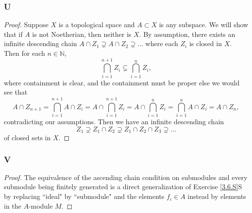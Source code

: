 \documentclass{article}
\newcommand{\N}{\mathbb{N}}
\begin{document}
\subsubsection{U}\label{3.6.U}
\begin{proof}
    Suppose $X$ is a topological space and $A\subset X$ is any subspace. We will show that if $A$ is not Noetherian, then neither is $X$. By assumption, there exists an infinite descending chain $A \cap Z_1 \supsetneq A\cap Z_2 \supsetneq \dots$ where each $Z_i$ is closed in $X$. %
    Then for each $n\in \N$,
    \[
    \bigcap_{i=1}^{n+1} Z_i\subsetneq \bigcap_{i=1}^n Z_i,
    \]
    where containment is clear, and the containment must be proper else we would see that
    \[
    A\cap Z_{n+1}= \bigcap_{i=1}^{n+1} A \cap Z_i = A \cap \bigcap_{i=1}^{n+1} Z_i = A \cap \bigcap_{i=1}^n Z_i = \bigcap_{i=1}^n A\cap Z_i = A\cap Z_n,
    \]
    contradicting our assumptions. Then we have an infinite descending chain
    \[
    Z_1 \supsetneq Z_1 \cap Z_2 \supsetneq Z_1 \cap Z_2 \cap Z_3 \supsetneq \dots
    \]
    of closed sets in $X$.
\end{proof}
\subsubsection{V}\label{3.6.V}
\begin{proof}
    The equivalence of the ascending chain condition on submodules and every submodule being finitely generated is a direct generalization of Exercise \ref{3.6.S}S by replacing ``ideal" by ``submodule" and the elements $f_i \in A$ instead by elements in the $A$-module $M$.
\end{proof}
\end{document}
